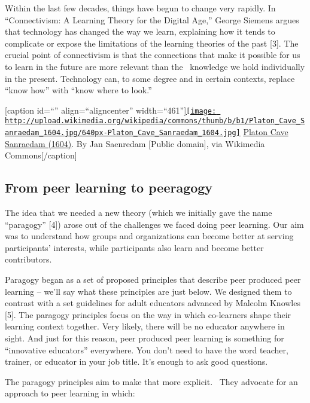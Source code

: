 Within the last few decades, things have begun to change very rapidly.
In ``Connectivism: A Learning Theory for the Digital Age,'' George
Siemens argues that technology has changed the way we learn, explaining
how it tends to complicate or expose the limitations of the learning
theories of the past {[}3{]}. The crucial point of connectivism is that
the connections that make it possible for us to learn in the future are
more relevant than the~ knowledge we hold individually in the present.
Technology can, to some degree and in certain contexts, replace ``know
how'' with ``know where to look.''

{[}caption id=``'' align=``aligncenter''
width=``461''{]}\href{http://commons.wikimedia.org/wiki/File:Platon_Cave_Sanraedam_1604.jpg}{\texttt{[image: http://upload.wikimedia.org/wikipedia/commons/thumb/b/b1/Platon\_Cave\_Sanraedam\_1604.jpg/640px-Platon\_Cave\_Sanraedam\_1604.jpg]}}
\href{http://commons.wikimedia.org/w/index.php?title=File:Platon_Cave_Sanraedam_1604.jpg\&oldid=68567627}{Platon
Cave Sanraedam (1604)}. By Jan Saenredam {[}Public domain{]}, via
Wikimedia Commons{[}/caption{]}

\subsection{From peer learning to peeragogy}

The idea that we needed a new theory (which we initially gave the name
``paragogy'' {[}4{]}) arose out of the challenges we faced doing peer
learning. Our aim was to understand how groups and organizations can
become better at serving participants' interests, while participants
also learn and become better contributors.

Paragogy began as a set of proposed principles that describe peer
produced peer learning -- we'll say what these principles are just
below. We designed them to contrast with a set guidelines for adult
educators advanced by Malcolm Knowles {[}5{]}. The paragogy principles
focus on the way in which co-learners shape their learning context
together. Very likely, there will be no educator anywhere in sight. And
just for this reason, peer produced peer learning is something for
``innovative educators'' everywhere. You don't need to have the word
teacher, trainer, or educator in your job title. It's enough to ask good
questions.

The paragogy principles aim to make that more explicit.~ They advocate
for an approach to peer learning in which:

